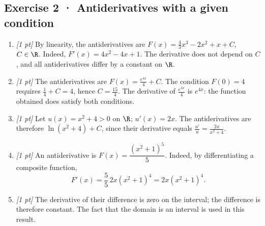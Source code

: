\subsection*{Exercise 2 · Antiderivatives with a given condition}\begin{enumerate}

\item \textit{[1 pt]} By linearity, the antiderivatives are $F(x)=\frac{4}{3}x^3-2x^2+x+C$, $C\in\R$. Indeed, $F'(x)=4x^2-4x+1$. The derivative does not depend on $C$, and all antiderivatives differ by a constant on $\R$.

\item \textit{[1 pt]} The antiderivatives are $F(x)=\frac{e^{4x}}{4}+C$. The condition $F(0)=4$ requires $\frac{1}{4}+C=4$, hence $C=\frac{15}{4}$. The derivative of $\frac{e^{4x}}{4}$ is $e^{4x}$: the function obtained does satisfy both conditions.

\item \textit{[1 pt]} Let $u(x)=x^2+4>0$ on $\R$; $u'(x)=2x$. The antiderivatives are therefore $\ln(x^2+4)+C$, since their derivative equals $\frac{u'}{u}=\frac{2x}{x^2+4}$.

\item \textit{[1 pt]} An antiderivative is $F(x)=\dfrac{(x^2+1)^{5}}{5}$. Indeed, by differentiating a composite function,
\[F'(x)=\frac{5}{5}\,2x(x^2+1)^{4}=2x(x^2+1)^{4}.\]

\item \textit{[1 pt]} The derivative of their difference is zero on the interval; the difference is therefore constant. The fact that the domain is an interval is used in this result.

\end{enumerate}

